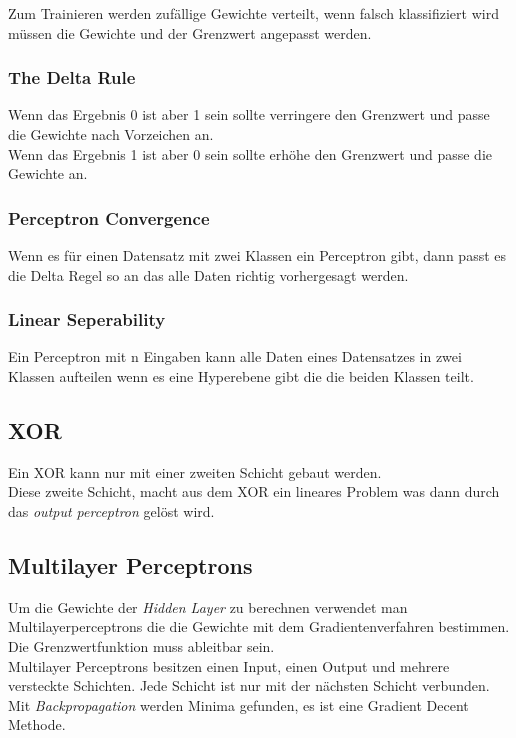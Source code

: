 \documentclass[a4paper]{scrartcl}
\begin{document}
Zum Trainieren werden zufällige Gewichte verteilt, wenn falsch klassifiziert wird müssen die Gewichte und der Grenzwert angepasst werden.

\subsubsection{The Delta Rule}
Wenn das Ergebnis 0 ist aber 1 sein sollte verringere den Grenzwert und passe die Gewichte nach Vorzeichen an.\\
Wenn das Ergebnis 1 ist aber 0 sein sollte erhöhe den Grenzwert und passe die Gewichte an.\\

\subsubsection{Perceptron Convergence}
Wenn es für einen Datensatz mit zwei Klassen ein Perceptron gibt, dann passt es die Delta Regel so an das alle Daten richtig vorhergesagt werden.

\subsubsection{Linear Seperability}
Ein Perceptron mit n Eingaben kann alle Daten eines Datensatzes in zwei Klassen aufteilen wenn es eine Hyperebene gibt die die beiden Klassen teilt.

\subsection{XOR}
Ein XOR kann nur mit einer zweiten Schicht gebaut werden.\\
Diese zweite Schicht, macht aus dem XOR ein lineares Problem was dann durch das \textit{output perceptron} gelöst wird.

\subsection{Multilayer Perceptrons}
Um die Gewichte der \textit{Hidden Layer} zu berechnen verwendet man Multilayerperceptrons die die Gewichte mit dem Gradientenverfahren bestimmen. Die Grenzwertfunktion muss ableitbar sein.\\
Multilayer Perceptrons besitzen einen Input, einen Output und mehrere versteckte Schichten. Jede Schicht ist nur mit der nächsten Schicht verbunden.\\
Mit \textit{Backpropagation} werden Minima gefunden, es ist eine Gradient Decent Methode.
\end{document}
